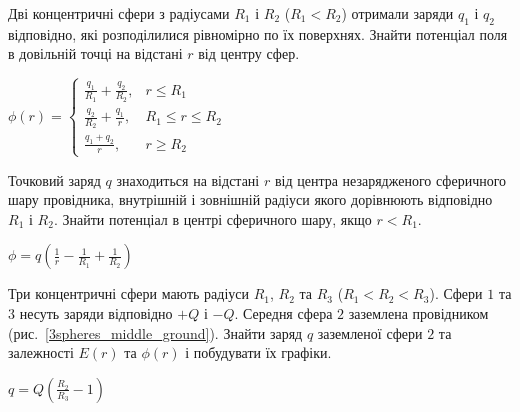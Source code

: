 \begin{problem}
Дві концентричні сфери з радіусами $R_1$ і $R_2$ ($R_1 < R_2$) отримали заряди $q_1$ і $q_2$ відповідно, які розподілилися рівномірно по їх поверхнях. Знайти потенціал поля в довільній точці на відстані $r$ від центру сфер.
\begin{solution}
	$
		\phi(r) =
		\begin{cases}
			\frac{q_1}{R_1} + \frac{q_2}{R_2}, & r \le R_1         \\
			\frac{q_2}{R_2} + \frac{q_1}{r} ,  & R_1 \le r \le R_2 \\
			\frac{q_1 + q_2}{r} ,              & r \ge R_2
		\end{cases}
	$
\end{solution}
\end{problem}

\begin{problem}
Точковий заряд $q$ знаходиться на відстані $r$ від центра незарядженого сферичного шару провідника, внутрішній і зовнішній радіуси якого дорівнюють відповідно $R_1$ і $R_2$. Знайти потенціал в центрі сферичного шару, якщо $r < R_1$.
\begin{solution}
	$\phi = q\left( \frac{1}{r} - \frac{1}{R_1} + \frac{1}{R_2}\right) $
\end{solution}
\end{problem}


\begin{problem}\label{prb:3spheres_middle_ground}
Три концентричні сфери мають радіуси $R_1$, $R_2$ та $R_3$ ($R_1 <R_2 < R_3$). Сфери $1$ та $3$ несуть заряди відповідно $+Q$
і $-Q$. Середня сфера $2$ заземлена провідником (рис.~\ref{3spheres_middle_ground}). Знайти заряд $q$ заземленої сфери $2$ та залежності $E(r)$ та $\phi(r)$ і побудувати їх графіки.
\begin{solution}
	$q=Q\left( \frac{R_2}{R_3} - 1\right) $
\end{solution}
\end{problem}

